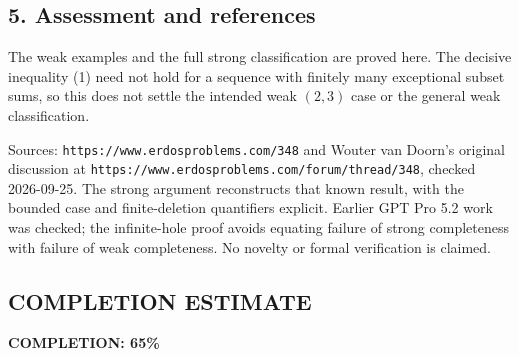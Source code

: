 \subsection*{5. Assessment and references}
The weak examples and the full strong classification are proved here.
The decisive inequality (1) need not hold for a sequence with finitely
many exceptional subset sums, so this does not settle the intended
weak $(2,3)$ case or the general weak classification.

Sources: \texttt{https://www.erdosproblems.com/348} and Wouter van Doorn's
original discussion at
\texttt{https://www.erdosproblems.com/forum/thread/348}, checked 2026-09-25.
The strong argument reconstructs that known result, with the bounded
case and finite-deletion quantifiers explicit. Earlier GPT Pro 5.2
work was checked; the infinite-hole proof avoids equating failure of
strong completeness with failure of weak completeness.
No novelty or formal verification is claimed.
\subsection*{COMPLETION ESTIMATE}
\textbf{COMPLETION: 65\%}
